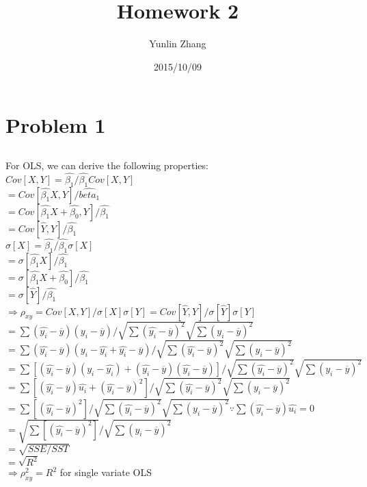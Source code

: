\documentclass[11pt, oneside]{article}   	%
\title{Homework 2}
\author{Yunlin Zhang}
\date{2015/10/09}							%
\begin{document}
\maketitle
\section{Problem 1}
\subsection{}
For OLS, we can derive the following properties:\\
$Cov[X,Y]=\hat{\beta_1}/\hat{\beta_1}Cov[X,Y]$\\
\indent$=Cov[\hat{\beta_1}X,Y]/\hat{beta_1}$\\
\indent$=Cov[\hat{\beta_1}X+\hat{\beta_0},Y]/\hat{\beta_1}$\\
\indent$=Cov[\hat{Y},Y]/\hat{\beta_1}$\\
$\sigma[X]=\hat{\beta_1}/\hat{\beta_1}\sigma[X]$\\
\indent$=\sigma[\hat{\beta_1}X]/\hat{\beta_1}$\\
\indent$=\sigma[\hat{\beta_1}X+\hat{\beta_0}]/\hat{\beta_1}$\\
\indent$=\sigma[\hat{Y}]/\hat{\beta_1}$\\
$\Rightarrow\rho_{xy}=Cov[X,Y]/\sigma[X]\sigma[Y]=Cov[\hat{Y},Y]/\sigma[\hat{Y}]\sigma[Y]$\\
\indent$=\sum(\hat{y_i}-\overline{y})(y_i-\overline{y})/\sqrt{\sum(\hat{y_i}-\overline{y})^2}\sqrt{\sum(y_i-\overline{y})^2}$\\
\indent$=\sum(\hat{y_i}-\overline{y})(y_i-\hat{y_i}+\hat{y_i}-\overline{y})/\sqrt{\sum(\hat{y_i}-\overline{y})^2}\sqrt{\sum(y_i-\overline{y})^2}$\\
\indent$=\sum[(\hat{y_i}-\overline{y})(y_i-\hat{y_i})+(\hat{y_i}-\overline{y})(\hat{y_i}-\overline{y})]/\sqrt{\sum(\hat{y_i}-\overline{y})^2}\sqrt{\sum(y_i-\overline{y})^2}$\\
\indent$=\sum[(\hat{y_i}-\overline{y})\hat{u_i}+(\hat{y_i}-\overline{y})^2]/\sqrt{\sum(\hat{y_i}-\overline{y})^2}\sqrt{\sum(y_i-\overline{y})^2}$\\
\indent$=\sum[(\hat{y_i}-\overline{y})^2]/\sqrt{\sum(\hat{y_i}-\overline{y})^2}\sqrt{\sum(y_i-\overline{y})^2}$\hfill$\because\sum(\hat{y_i}-\overline{y})\hat{u_i}=0$\\
\indent$=\sqrt{\sum[(\hat{y_i}-\overline{y})^2]}/\sqrt{\sum(y_i-\overline{y})^2}$\\
\indent$=\sqrt{SSE/SST}$\\
\indent$=\sqrt{R^2}$\\
$\Rightarrow\rho_{xy}^2=R^2$ for single variate OLS\\
\end{document}
